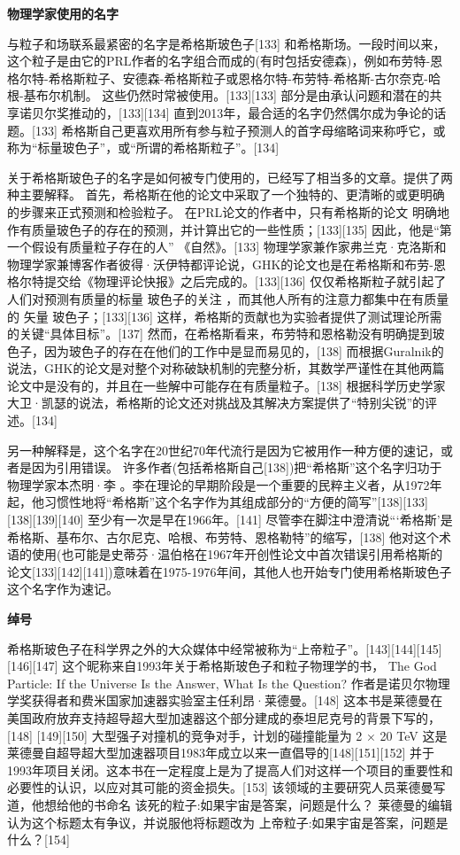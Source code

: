 \textbf{物理学家使用的名字}

与粒子和场联系最紧密的名字是希格斯玻色子[133] 和希格斯场。一段时间以来，这个粒子是由它的PRL作者的名字组合而成的(有时包括安德森)，例如布劳特-恩格尔特-希格斯粒子、安德森-希格斯粒子或恩格尔特-布劳特-希格斯-古尔奈克-哈根-基布尔机制。 这些仍然时常被使用。[133][133] 部分是由承认问题和潜在的共享诺贝尔奖推动的，[133][134] 直到2013年，最合适的名字仍然偶尔成为争论的话题。[133] 希格斯自己更喜欢用所有参与粒子预测人的首字母缩略词来称呼它，或称为“标量玻色子”，或“所谓的希格斯粒子”。[134]

关于希格斯玻色子的名字是如何被专门使用的，已经写了相当多的文章。提供了两种主要解释。 首先，希格斯在他的论文中采取了一个独特的、更清晰的或更明确的步骤来正式预测和检验粒子。 在PRL论文的作者中，只有希格斯的论文 明确地 作有质量玻色子的存在的预测，并计算出它的一些性质；[133][135] 因此，他是“第一个假设有质量粒子存在的人” 《自然》。[133] 物理学家兼作家弗兰克·克洛斯和物理学家兼博客作者彼得·沃伊特都评论说，GHK的论文也是在希格斯和布劳-恩格尔特提交给《物理评论快报》之后完成的。[133][136] 仅仅希格斯粒子就引起了人们对预测有质量的标量 玻色子的关注 ，而其他人所有的注意力都集中在有质量的 矢量 玻色子；[133][136] 这样，希格斯的贡献也为实验者提供了测试理论所需的关键“具体目标”。[137] 然而，在希格斯看来，布劳特和恩格勒没有明确提到玻色子，因为玻色子的存在在他们的工作中是显而易见的，[138] 而根据Guralnik的说法，GHK的论文是对整个对称破缺机制的完整分析，其数学严谨性在其他两篇论文中是没有的，并且在一些解中可能存在有质量粒子。[138] 根据科学历史学家大卫·凯瑟的说法，希格斯的论文还对挑战及其解决方案提供了“特别尖锐”的评述。[134]

另一种解释是，这个名字在20世纪70年代流行是因为它被用作一种方便的速记，或者是因为引用错误。 许多作者(包括希格斯自己[138])把“希格斯”这个名字归功于物理学家本杰明·李 。李在理论的早期阶段是一个重要的民粹主义者，从1972年起，他习惯性地将“希格斯”这个名字作为其组成部分的“方便的简写”[138][133][138][139][140] 至少有一次是早在1966年。[141] 尽管李在脚注中澄清说“‘希格斯’是希格斯、基布尔、古尔尼克、哈根、布劳特、恩格勒特”的缩写，[138] 他对这个术语的使用(也可能是史蒂芬·温伯格在1967年开创性论文中首次错误引用希格斯的论文[133][142][141])意味着在1975-1976年间，其他人也开始专门使用希格斯玻色子这个名字作为速记。

\textbf{绰号}

希格斯玻色子在科学界之外的大众媒体中经常被称为“上帝粒子”。[143][144][145][146][147] 这个昵称来自1993年关于希格斯玻色子和粒子物理学的书， The God Particle: If the Universe Is the Answer, What Is the Question? 作者是诺贝尔物理学奖获得者和费米国家加速器实验室主任利昂·莱德曼。[148] 这本书是莱德曼在美国政府放弃支持超导超大型加速器这个部分建成的泰坦尼克号的背景下写的，[148] [149][150] 大型强子对撞机的竞争对手，计划的碰撞能量为 2 × 20 TeV 这是莱德曼自超导超大型加速器项目1983年成立以来一直倡导的[148][151][152] 并于1993年项目关闭。这本书在一定程度上是为了提高人们对这样一个项目的重要性和必要性的认识，以应对其可能的资金损失。[153] 该领域的主要研究人员莱德曼写道，他想给他的书命名 该死的粒子:如果宇宙是答案，问题是什么？ 莱德曼的编辑认为这个标题太有争议，并说服他将标题改为 上帝粒子:如果宇宙是答案，问题是什么？[154]

